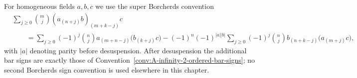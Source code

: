 \begin{convention}
\label{conv:borcherds-mode-signs}
For homogeneous fields \(a,b,c\) we use the super Borcherds convention
\begin{equation}\label{eq:borcherds-mode-signs}
\begin{aligned}
&\sum_{j\ge0}\binom{m}{j}
  (a_{(n+j)}b)_{(m+k-j)}c  \\
&\qquad =
\sum_{j\ge0}(-1)^j\binom{n}{j}
a_{(m+n-j)}\bigl(b_{(k+j)}c\bigr)
-(-1)^n(-1)^{|a||b|}
\sum_{j\ge0}(-1)^j\binom{n}{j}
b_{(n+k-j)}\bigl(a_{(m+j)}c\bigr),
\end{aligned}
\end{equation}
with \(|a|\) denoting parity before desuspension.  After desuspension
the additional bar signs are exactly those of
Convention~\ref{conv:A-infinity-2-ordered-bar-signs}; no second
Borcherds sign convention is used elsewhere in this chapter.
\end{convention}

